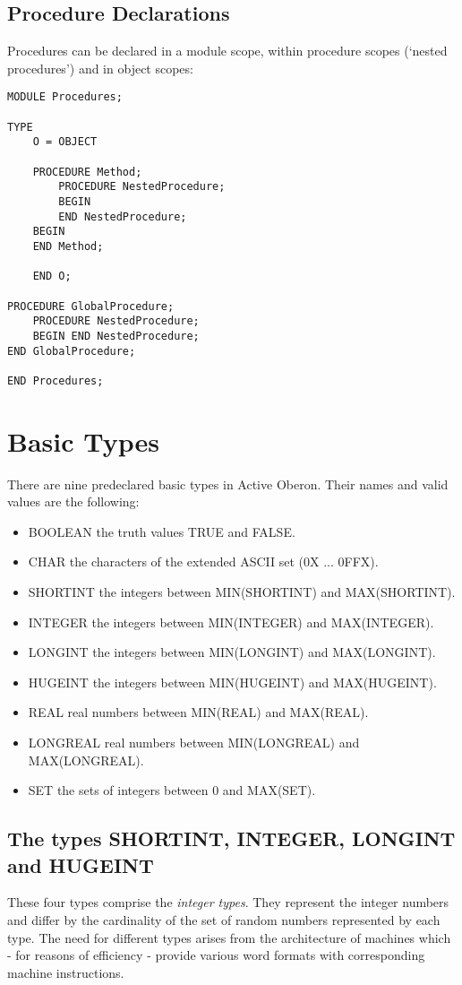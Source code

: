 \documentclass[a4paper,11pt]{article}
\begin{document}
\subsection{Procedure Declarations}
Procedures can be declared in a module scope, within procedure scopes (`nested procedures') and in object scopes:
\begin{lstlisting}[language=Oberon,frame=none,caption={Procedures}]
MODULE Procedures;

TYPE
    O = OBJECT

    PROCEDURE Method;
        PROCEDURE NestedProcedure;
        BEGIN
        END NestedProcedure;
    BEGIN
    END Method;

    END O;

PROCEDURE GlobalProcedure;
    PROCEDURE NestedProcedure;
    BEGIN END NestedProcedure;
END GlobalProcedure;

END Procedures;
\end{lstlisting}

\section{Basic Types}\label{section:BasicTypes}
There are nine predeclared basic types in Active Oberon. Their names and valid values are the following:

\begin{itemize}
\item BOOLEAN the truth values TRUE and FALSE.
\item CHAR the characters of the extended ASCII set (0X ... 0FFX).
\item SHORTINT the integers between MIN(SHORTINT) and MAX(SHORTINT).
\item INTEGER the integers between MIN(INTEGER) and MAX(INTEGER).
\item LONGINT the integers between MIN(LONGINT) and MAX(LONGINT).
\item HUGEINT the integers between MIN(HUGEINT) and MAX(HUGEINT).
\item REAL real numbers between MIN(REAL) and MAX(REAL).
\item LONGREAL real numbers between MIN(LONGREAL) and MAX(LONGREAL).
\item SET the sets of integers between 0 and MAX(SET).
\end{itemize}

\subsection{The types SHORTINT, INTEGER, LONGINT and HUGEINT}\label{subsection:IntegerTypes}
These four types comprise the {\em integer types}. They represent the integer numbers and differ by the cardinality of the set of random numbers represented by each type. The need for different types arises from the architecture of machines which - for reasons of efficiency - provide various word formats with corresponding machine instructions.
\end{document}
